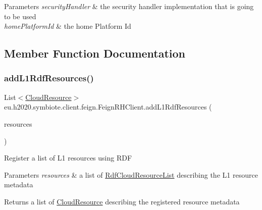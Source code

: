 \begin{DoxyParams}{Parameters}
{\em security\+Handler} & the security handler implementation that is going to be used \\
\hline
{\em home\+Platform\+Id} & the home Platform Id \\
\hline
\end{DoxyParams}


\subsection{Member Function Documentation}
\mbox{\label{classeu_1_1h2020_1_1symbiote_1_1client_1_1feign_1_1FeignRHClient_aa15dbd07f234fb7b16db50309af8cd12}} 
\subsubsection{\texorpdfstring{add\+L1\+Rdf\+Resources()}{addL1RdfResources()}}
{\footnotesize\ttfamily List$<$\hyperlink{classeu_1_1h2020_1_1symbiote_1_1cloud_1_1model_1_1internal_1_1CloudResource}{Cloud\+Resource}$>$ eu.\+h2020.\+symbiote.\+client.\+feign.\+Feign\+R\+H\+Client.\+add\+L1\+Rdf\+Resources (\begin{DoxyParamCaption}\item[{\hyperlink{classeu_1_1h2020_1_1symbiote_1_1cloud_1_1model_1_1internal_1_1RdfCloudResourceList}{Rdf\+Cloud\+Resource\+List}}]{resources }\end{DoxyParamCaption})}

Register a list of L1 resources using R\+DF


\begin{DoxyParams}{Parameters}
{\em resources} & a list of \hyperlink{}{Rdf\+Cloud\+Resource\+List} describing the L1 resource metadata \\
\hline
\end{DoxyParams}
\begin{DoxyReturn}{Returns}
a list of \hyperlink{}{Cloud\+Resource} describing the registered resource metadata 
\end{DoxyReturn}


